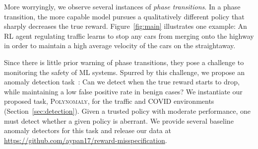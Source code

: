 


More worryingly, we observe several instances of \emph{phase transitions}. In a phase transition, the more capable model pursues a qualitatively different policy that sharply decreases the true reward. Figure~\ref{fig:main} illustrates one example: An RL agent regulating traffic learns to stop any cars from merging onto the highway in order to maintain a high average velocity of the cars on the straightaway. 

Since there is little prior warning of phase transitions, they pose a challenge to monitoring the safety of ML systems.
Spurred by this challenge, we propose an anomaly detection task~\citep{Hendrycks2017ABF, %
Tack2020CSIND}: Can we detect when the true reward starts to drop, while maintaining a low false positive rate in benign cases? We instantiate our proposed task, \textsc{Polynomaly}, for the traffic and COVID environments (Section~\ref{sec:detection}). Given a trusted policy with moderate performance, one must detect whether a given policy is aberrant. %
We provide several baseline anomaly detectors for this task and release our data at \url{https://github.com/aypan17/reward-misspecification}. 




